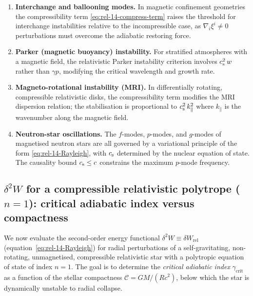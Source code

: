 \begin{enumerate}
\item \textbf{Interchange and ballooning modes.}  In magnetic
  confinement geometries the compressibility term
  \eqref{eq:rel-14-compress-term} raises the threshold for
  interchange instabilities relative to the incompressible case, as
  $\nabla_{i}\xi^{i}\neq 0$ perturbations must overcome the adiabatic
  restoring force.

\item \textbf{Parker (magnetic buoyancy) instability.}  For
  stratified atmospheres with a magnetic field, the relativistic
  Parker instability criterion involves $c_{\mathrm{s}}^{2}\,w$ rather than
  $\gamma p$, modifying the critical wavelength and growth rate.

\item \textbf{Magneto-rotational instability (MRI).}  In
  differentially rotating, compressible relativistic disks, the
  compressibility term modifies the MRI dispersion relation; the
  stabilisation is proportional to $c_{\mathrm{s}}^{2}\,k_{\parallel}^{2}$
  where $k_{\parallel}$ is the wavenumber along the magnetic field.

\item \textbf{Neutron-star oscillations.}  The $f$-modes, $p$-modes,
  and $g$-modes of magnetised neutron stars are all governed by a
  variational principle of the form \eqref{eq:rel-14-Rayleigh},
  with $c_{\mathrm{s}}$ determined by the nuclear equation of state.  The
  causality bound $c_{\mathrm{s}} \le c$ constrains the maximum $p$-mode
  frequency.
\end{enumerate}

\subsection{$\delta^{2}W$ for a compressible relativistic polytrope
($n=1$): critical adiabatic index versus compactness}
\label{sec:rel-123-polytrope}

We now evaluate the second-order energy functional $\delta^{2}W
\equiv \delta W_{\mathrm{rel}}$ (equation~\eqref{eq:rel-14-Rayleigh})
for radial perturbations of a self-gravitating, non-rotating,
unmagnetised, compressible relativistic star with a polytropic
equation of state of index $n = 1$.  The goal is to determine the
\emph{critical adiabatic index} $\gamma_{\mathrm{crit}}$ as a
function of the stellar compactness $\mathscr{C} = GM/(Rc^{2})$,
below which the star is dynamically unstable to radial collapse.

